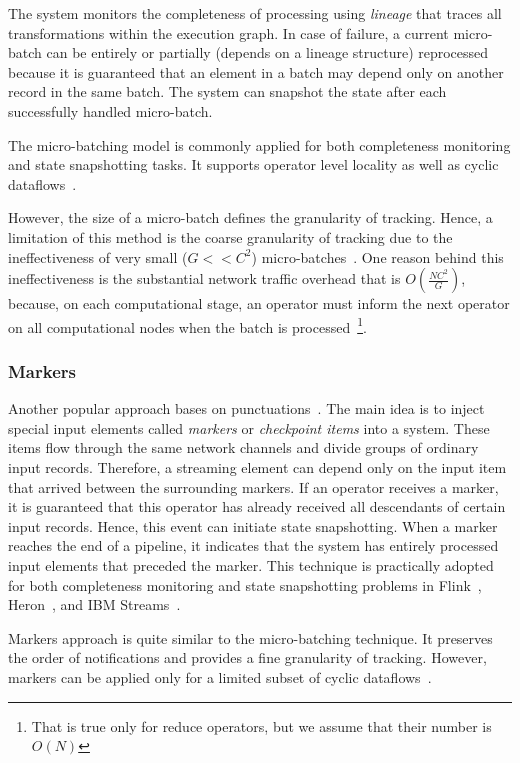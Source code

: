 The system monitors the completeness of processing using {\em lineage} that traces all transformations within the execution graph. In case of failure, a current micro-batch can be entirely or partially (depends on a lineage structure) reprocessed because it is guaranteed that an element in a batch may depend only on another record in the same batch. The system can snapshot the state after each successfully handled micro-batch. 

The micro-batching model is commonly applied for both completeness monitoring and state snapshotting tasks.  It supports operator level locality as well as cyclic dataflows~\cite{meng2016mllib}. 

However, the size of a micro-batch defines the granularity of tracking. Hence, a limitation of this method is the coarse granularity of tracking due to the ineffectiveness of very small ($G << C^2$) micro-batches~\cite{Zaharia:2012:DSE:2342763.2342773}. One reason behind this ineffectiveness is the substantial network traffic overhead that is $O(\frac{NC^2}{G})$, because, on each computational stage, an operator must inform the next operator on all computational nodes when the batch is processed~\footnote{That is true only for reduce operators, but we assume that their number is $O(N)$}.

\subsubsection{Markers}

Another popular approach bases on punctuations~\cite{Tucker:2003:EPS:776752.776780}. The main idea is to inject special input elements called {\em markers} or {\em checkpoint items} into a system. These items flow through the same network channels and divide groups of ordinary input records. Therefore, a streaming element can depend only on the input item that arrived between the surrounding markers. If an operator receives a marker, it is guaranteed that this operator has already received all descendants of certain input records. Hence, this event can initiate state snapshotting. When a marker reaches the end of a pipeline, it indicates that the system has entirely processed input elements that preceded the marker. This technique is practically adopted for both completeness monitoring and state snapshotting problems in Flink~\cite{Carbone:2017:SMA:3137765.3137777}, Heron~\cite{Kulkarni:2015:THS:2723372.2742788}, and IBM Streams~\cite{jacques2016consistent}. 

Markers approach is quite similar to the micro-batching technique. It preserves the order of notifications and provides a fine granularity of tracking. However, markers can be applied only for a limited subset of cyclic dataflows~\cite{carbone2018scalable}. 

